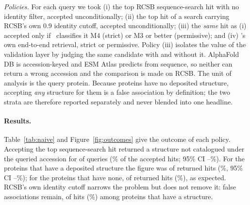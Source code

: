 \emph{Policies.} For each query we took (i) the top RCSB sequence-search hit
with no identity filter, accepted unconditionally; (ii) the top hit of a search
carrying RCSB's own 0.9 identity cutoff, accepted unconditionally; (iii) the
\emph{same} hit as (i) accepted only if \bsi\ classifies it M4 (strict) or M3 or
better (permissive); and (iv) \bsi's own end-to-end retrieval, strict or
permissive. Policy (iii) isolates the value of the validation layer by judging
the same candidate with and without it. AlphaFold DB is accession-keyed and ESM
Atlas predicts from sequence, so neither can return a wrong accession and the
comparison is made on RCSB. The unit of analysis is the query protein. Because
 proteins have no deposited structure, accepting \emph{any} structure for
them is a false association by definition; the two strata are therefore
reported separately and never blended into one headline.

\paragraph{Results.}
Table~\ref{tab:naive} and Figure~\ref{fig:outcomes} give the outcome of each
policy. Accepting the top sequence-search hit returned a structure not
catalogued under the queried accession for  of 
queries (\% of the  accepted hits; 95\% CI
--\%). For the  proteins that have a
deposited structure the figure was  of  returned
hits (\%, 95\% CI --\%); for the
 proteins that have none,  of  returned hits
(\%), as expected. RCSB's own identity cutoff narrows the problem
but does not remove it:  false associations remain, 
of  hits (\%) among proteins that have a structure.


